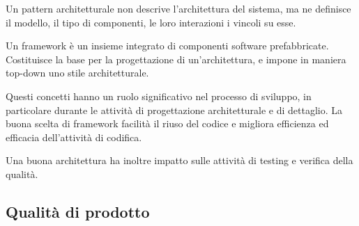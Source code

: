 Un pattern architetturale non descrive l'architettura del sistema, ma ne
definisce il modello, il tipo di componenti, le loro interazioni i vincoli su
esse.

Un framework è un insieme integrato di componenti software prefabbricate.
Costituisce la base per la progettazione  di
un'architettura, e impone in maniera top-down uno stile architetturale.

Questi concetti hanno un ruolo significativo nel processo di sviluppo, in
particolare durante le attività di progettazione architetturale e di dettaglio.
La buona scelta di framework facilità il riuso del codice e migliora
efficienza ed efficacia dell'attività di codifica.

Una buona architettura ha inoltre impatto sulle attività di testing e verifica
della qualità.

\subsection{Qualità di prodotto}
\label{sub:qualit_di_prodotto}
